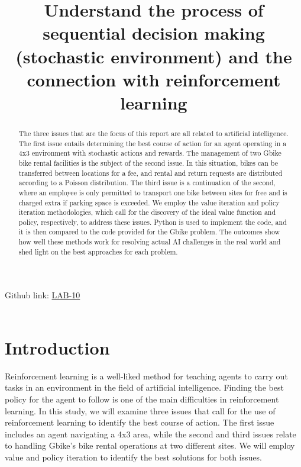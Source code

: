 \documentclass[conference]{IEEEtran}
\begin{document}
\title{Understand the process of sequential decision making (stochastic environment) and the connection with reinforcement learning}
\author{
\and
{}
\and
{}
\and
{}
}
\maketitle
\setlength{\parindent}{20pt}
\noindent Github link: \href{https://github.com/JARVIS-codebase/LAB-10}{LAB-10} \\ \\ 
\indent \begin{abstract}
The three issues that are the focus of this report are all related to artificial intelligence. The first issue entails determining the best course of action for an agent operating in a 4x3 environment with stochastic actions and rewards. The management of two Gbike bike rental facilities is the subject of the second issue. In this situation, bikes can be transferred between locations for a fee, and rental and return requests are distributed according to a Poisson distribution.
The third issue is a continuation of the second, where an employee is only permitted to transport one bike between sites for free and is charged extra if parking space is exceeded. We employ the value iteration and policy iteration methodologies, which call for the discovery of the ideal value function and policy, respectively, to address these issues. Python is used to implement the code, and it is then compared to the code provided for the Gbike problem. The outcomes show how well these methods work for resolving actual AI challenges in the real world and shed light on the best approaches for each problem.
\end{abstract}
\IEEEpeerreviewmaketitle
\section{Introduction}
Reinforcement learning is a well-liked method for teaching agents to carry out tasks in an environment in the field of artificial intelligence. Finding the best policy for the agent to follow is one of the main difficulties in reinforcement learning. In this study, we will examine three issues that call for the use of reinforcement learning to identify the best course of action. The first issue includes an agent navigating a 4x3 area, while the second and third issues relate to handling Gbike's bike rental operations at two different sites. We will employ value and policy iteration to identify the best solutions for both issues.
\end{document}
